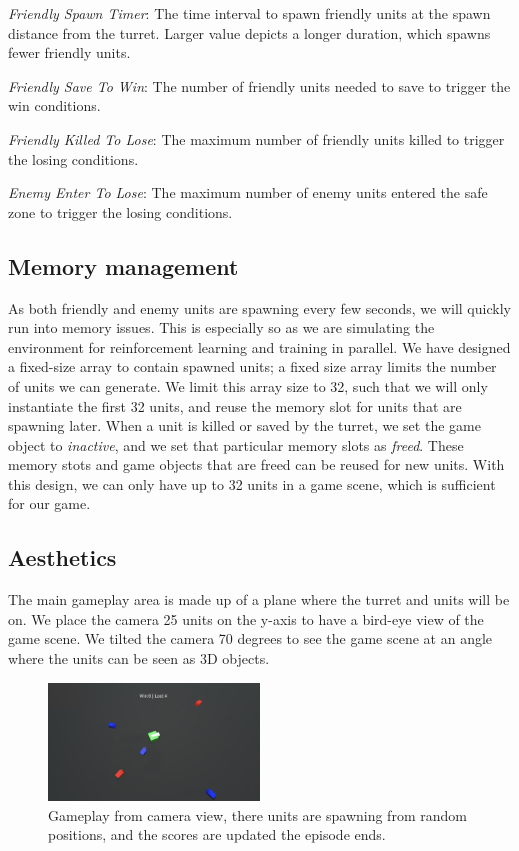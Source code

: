 \documentclass[conference]{IEEEtran}
\begin{document}
\textit{Friendly Spawn Timer}: The time interval to spawn friendly units at the spawn distance from the turret. Larger value depicts a longer duration, which spawns fewer friendly units.

\textit{Friendly Save To Win}: The number of friendly units needed to save to trigger the win conditions.

\textit{Friendly Killed To Lose}: The maximum number of friendly units killed to trigger the losing conditions.

\textit{Enemy Enter To Lose}: The maximum number of enemy units entered the safe zone to trigger the losing conditions.

\subsection{Memory management}

As both friendly and enemy units are spawning every few seconds, we will quickly run into memory issues. This is especially so as we are simulating the environment for reinforcement learning and training in parallel. We have designed a fixed-size array to contain spawned units; a fixed size array limits the number of units we can generate. We limit this array size to 32, such that we will only instantiate the first 32 units, and reuse the memory slot for units that are spawning later. When a unit is killed or saved by the turret, we set the game object to \textit{inactive}, and we set that particular memory slots as \textit{freed}. These memory stots and game objects that are freed can be reused for new units. With this design, we can only have up to 32 units in a game scene, which is sufficient for our game.

\subsection{Aesthetics}

The main gameplay area is made up of a plane where the turret and units will be on. We place the camera 25 units on the y-axis to have a bird-eye view of the game scene. We tilted the camera 70 degrees to see the game scene at an angle where the units can be seen as 3D objects. 

\begin{figure}[h]
\centerline{\includegraphics[width=0.5\textwidth]{assets/gameplay_random_spawn}}
\caption{Gameplay from camera view, there units are spawning from random positions, and the scores are updated the episode ends.}
\label{gameplay_random_spawn}
\end{figure}
\end{document}
